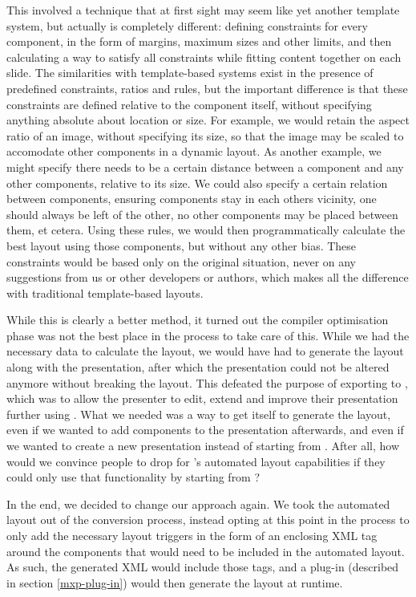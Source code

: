    This involved a technique that at first sight may seem like yet another
   template system, but actually is completely different: defining constraints
   for every component, in the form of margins, maximum sizes and other limits,
   and then calculating a way to satisfy all constraints while fitting content
   together on each slide. The similarities with template-based systems exist
   in the presence of predefined constraints, ratios and rules, but the
   important difference is that these constraints are defined relative to the
   component itself, without specifying anything absolute about location or
   size. For example, we would retain the aspect ratio of an image, without
   specifying its size, so that the image may be scaled to accomodate other
   components in a dynamic layout. As another example, we might specify there
   needs to be a certain distance between a component and any other components,
   relative to its size. We could also specify a certain relation between
   components, ensuring components stay in each others vicinity, one should
   always be left of the other, no other components may be placed between them,
   et cetera. Using these rules, we would then programmatically calculate the best
   layout using those components, but without any other bias. These constraints
   would be based only on the original situation, never on any suggestions from
   us or other developers or authors, which makes all the difference with
   traditional template-based layouts.
 
   While this is clearly a better method, it turned out the compiler
   optimisation phase was not the best place in the process to take care of
   this. While we had the necessary data to calculate the layout, we would have
   had to generate the layout along with the \mxp presentation, after which the
   presentation could not be altered anymore without breaking the layout. This
   defeated the purpose of exporting to \mxp, which was to allow the presenter
   to edit, extend and improve their presentation further using \mxp. What we
   needed was a way to get \mxp itself to generate the layout, even if we
   wanted to add components to the presentation afterwards, and even if we
   wanted to create a new \mxp presentation instead of starting from \ppt.
   After all, how would we convince people to drop \ppt for \mxp's automated
   layout capabilities if they could only use that functionality by starting
   from \ppt?

   In the end, we decided to change our approach again. We took the automated
   layout out of the conversion process, instead opting at this point in the
   process to only add the necessary layout triggers in the form of an
   enclosing XML tag around the components that would need to be included in
   the automated layout. As such, the generated \mxp XML would include those
   tags, and a plug-in (described in section \ref{mxp-plug-in}) would then
   generate the layout at runtime.
  
